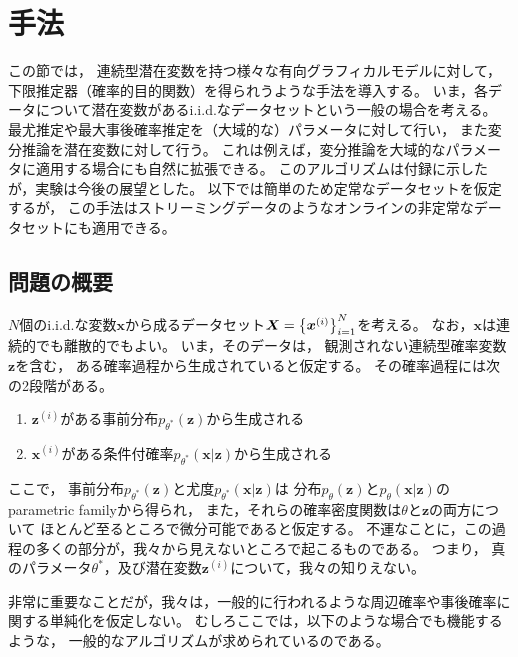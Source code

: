 \documentclass[dvipdfmx, fleqn, draft]{jsarticle}
\begin{document}
\section{手法}

この節では，
連続型潜在変数を持つ様々な有向グラフィカルモデルに対して，
下限推定器（確率的目的関数）を得られうような手法を導入する。
いま，各データについて潜在変数があるi.i.d.なデータセットという一般の場合を考える。
最尤推定や最大事後確率推定を（大域的な）パラメータに対して行い，
また変分推論を潜在変数に対して行う。
これは例えば，変分推論を大域的なパラメータに適用する場合にも自然に拡張できる。
このアルゴリズムは付録に示したが，実験は今後の展望とした。
以下では簡単のため定常なデータセットを仮定するが，
この手法はストリーミングデータのようなオンラインの非定常なデータセットにも適用できる。


\subsection{問題の概要}

\(N\)個のi.i.d.な変数\(\bm{x}\)から成るデータセット\(\bm{X} = \qty{\bm{x}^{(i)}}_{i=1}^{N}\)を考える。
なお，\(\bm{x}\)は連続的でも離散的でもよい。
いま，そのデータは，
観測されない連続型確率変数\(\bm{z}\)を含む，
ある確率過程から生成されていると仮定する。
その確率過程には次の2段階がある。
\begin{enumerate}[label=(\arabic*)]
    \item \(\bm{z}^{(i)}\)がある事前分布\(p_{\theta^*} (\bm{z})\)から生成される
    \item \(\bm{x}^{(i)}\)がある条件付確率\(p_{\theta^*} (\bm{x}|\bm{z})\)から生成される
\end{enumerate}
ここで，
事前分布\(p_{\theta^*} (\bm{z})\)と尤度\(p_{\theta^*} (\bm{x}|\bm{z})\)は
分布\(p_{\theta} (\bm{z})\)と\(p_{\theta} (\bm{x}|\bm{z})\)のparametric familyから得られ，
また，それらの確率密度関数は\(\theta\)と\(\bm{z}\)の両方について
ほとんど至るところで微分可能であると仮定する。
不運なことに，この過程の多くの部分が，我々から見えないところで起こるものである。
つまり，
真のパラメータ\(\theta^*\)，及び潜在変数\(\bm{z}^{(i)}\)について，我々の知りえない。

非常に重要なことだが，我々は，一般的に行われるような周辺確率や事後確率に関する単純化を仮定しない。
むしろここでは，以下のような場合でも機能するような，
一般的なアルゴリズムが求められているのである。
\end{document}

